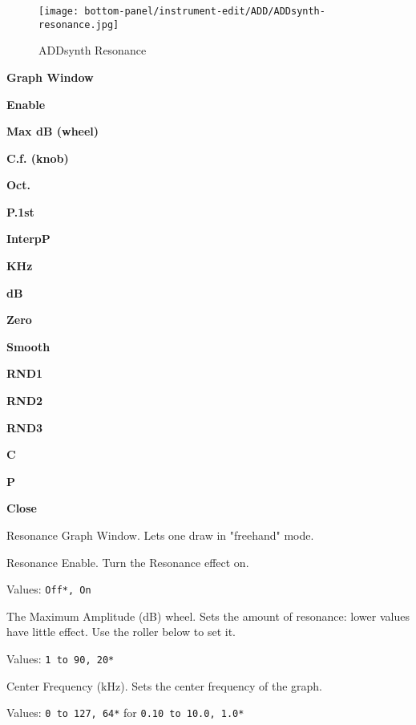 \begin{figure}[H]
   \centering 
   \texttt{[image: bottom-panel/instrument-edit/ADD/ADDsynth-resonance.jpg]}
   \caption{ADDsynth Resonance}
   \label{fig:addsynth_resonance}
\end{figure}

   \begin{enumber}
      \item \textbf{Graph Window}
      \item \textbf{Enable}
      \item \textbf{Max dB (wheel)}
      \item \textbf{C.f. (knob)}
      \item \textbf{Oct.}
      \item \textbf{P.1st}
      \item \textbf{InterpP}
      \item \textbf{KHz}
      \item \textbf{dB}
      \item \textbf{Zero}
      \item \textbf{Smooth}
      \item \textbf{RND1}
      \item \textbf{RND2}
      \item \textbf{RND3}
      \item \textbf{C}
      \item \textbf{P}
      \item \textbf{Close}
   \end{enumber}

   \setcounter{ItemCounter}{0}      %

   Resonance Graph Window.
   Lets one draw in "freehand" mode.

   Resonance Enable.
   Turn the Resonance effect on.

   Values: \texttt{Off*, On}

   The Maximum Amplitude (dB) wheel.
   Sets the amount of resonance: lower values have little effect. Use the
   roller below to set it. 

   Values: \texttt{1 to 90, 20*}

   Center Frequency (kHz).
   Sets the center frequency of the graph.

   Values: \texttt{0 to 127, 64*} for \texttt{0.10 to 10.0, 1.0*}


